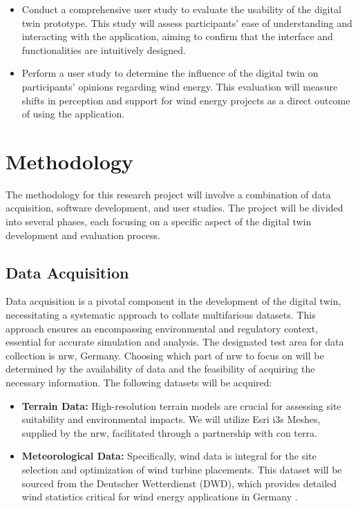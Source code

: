 \documentclass[11pt, titlepage, a4paper]{scrartcl}
\begin{document}
\begin{linenumbers}
\begin{itemize}[label={--}]
        \item Conduct a comprehensive user study to evaluate the usability of the digital twin prototype. This study will assess participants' ease of understanding and interacting with the application, aiming to confirm that the interface and functionalities are intuitively designed.
        \item Perform a user study to determine the influence of the digital twin on participants' opinions regarding wind energy. This evaluation will measure shifts in perception and support for wind energy projects as a direct outcome of using the application.
    \end{itemize}


    \section{Methodology}
    The methodology for this research project will involve a combination of data acquisition, software development, and user studies. The project will be divided into several phases, each focusing on a specific aspect of the digital twin development and evaluation process.

    \subsection{Data Acquisition}
    Data acquisition is a pivotal component in the development of the digital twin, necessitating a systematic approach to collate multifarious datasets. This approach ensures an encompassing environmental and regulatory context, essential for accurate simulation and analysis. The designated test area for data collection is \gls{nrw}, Germany. Choosing which part of \gls{nrw} to focus on will be determined by the availability of data and the feasibility of acquiring the necessary information.
    The following datasets will be acquired:

    \begin{itemize}
        \item \textbf{Terrain Data:} High-resolution terrain models are crucial for assessing site suitability and environmental impacts. We will utilize Esri \gls{i3s} Meshes, supplied by the \gls{nrw}, facilitated through a partnership with con terra.

        \item \textbf{Meteorological Data:} Specifically, wind data is integral for the site selection and optimization of wind turbine placements. This dataset will be sourced from the Deutscher Wetterdienst (DWD), which provides detailed wind statistics critical for wind energy applications in Germany \cite{deutscherwetterdienstWinddatenFurWindenergienutzer}.


\end{itemize}
\end{linenumbers}
\end{document}

